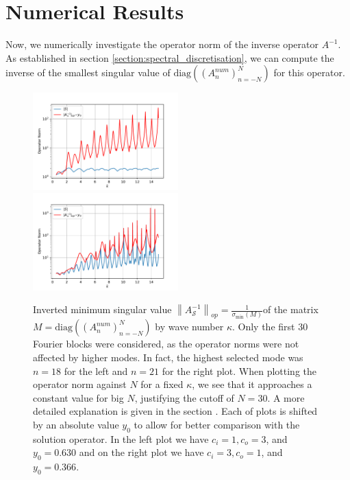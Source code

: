 \documentclass[12pt,journal,compsoc, onecolumn]{IEEEtran}
\begin{document}
\section{Numerical Results} 
\label{section:numerical_results}
Now, we numerically investigate the operator norm of the inverse operator $A^{-1}$. As established in section \ref{section:spectral_discretisation}, we can compute the inverse of the smallest singular value of $\mathrm{diag}((A_n^{num})_{n = -N}^N)$ for this operator.
\begin{figure}
    \includegraphics[width=0.5\textwidth]{simulation_scenario_1indexrange_-18.0-0.0_y_0_0.6300477177912973.pdf}
    \includegraphics[width=0.5\textwidth]{simulation_scenario_2indexrange_-21.0-0.0_y_0_0.36642407845221814.pdf}
    \caption{Inverted minimum singular value $\left\|A_{\mathcal{S}}^{-1}\right\|_{o p} =\frac{1}{\sigma_{\min }(M)}$of the matrix $M = \mathrm{diag}((A_n^{num})_{n = -N}^N)$ by wave number $\kappa$. Only the first 30 Fourier blocks were considered, as the operator norms were not affected by higher modes. In fact, the highest selected mode was $n = 18$ for the left and $n =21$ for the right plot.
    When plotting the operator norm against $N$ for a fixed $\kappa$, we see that it approaches a constant value for big $N$, justifying the cutoff of $N = 30$. A more detailed explanation is given in the section .
    Each of plots is shifted by an absolute value $y_0$ to allow for better comparison with the solution operator.
    In the left plot we have $c_i = 1, c_o = 3$, and $y_0 = 0.630$
    and on the right plot we have $c_i = 3, c_o = 1$, and $y_0 = 0.366$. }
   \label{fig:simulation_results}
\end{figure}
\end{document}
